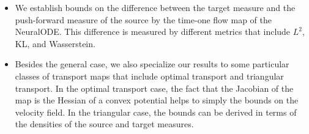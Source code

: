 \begin{itemize}
\item We establish bounds on the difference between the target measure
  and the push-forward measure of the source by the time-one flow map
  of the NeuralODE. This difference is measured by different metrics
  that include $L^2$, KL, and Wasserstein.
    
\item Besides the general case, we also specialize our results to some
  particular classes of transport maps that include optimal transport
  and triangular transport. In the optimal transport case, the fact
  that the Jacobian of the map is the Hessian of a convex potential
  helps to simply the bounds on the velocity field.  In the triangular case,
  the bounds can be derived in terms of the densities of the source
  and target measures.
    
    
\end{itemize}

